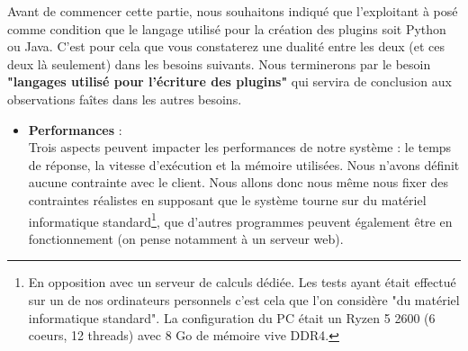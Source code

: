 \documentclass[a4paper,12pt]{article}
\begin{document}
Avant de commencer cette partie, nous souhaitons indiqué que l'exploitant à posé comme condition que le langage utilisé pour la création des plugins soit Python ou Java. C'est pour cela que vous constaterez une dualité entre les deux (et ces deux là seulement) dans les besoins suivants. Nous terminerons par le besoin \textbf{"langages utilisé pour l'écriture des plugins"} qui servira de conclusion aux observations faîtes dans les autres besoins.\\

\begin{itemize}
  
  \item \textbf{Performances} :\\
  Trois aspects peuvent impacter les performances de notre système : le temps de réponse, la vitesse d'exécution et la mémoire utilisées. Nous n'avons définit aucune contrainte avec le client. Nous allons donc nous même nous fixer des contraintes réalistes en supposant que le système tourne sur du matériel informatique standard\footnote{En opposition avec un serveur de calculs dédiée. Les tests ayant était effectué sur un de nos ordinateurs personnels c'est cela que l'on considère "du matériel informatique standard". La configuration du PC était un Ryzen 5 2600 (6 coeurs, 12 threads) avec 8 Go de mémoire vive DDR4.}, que d'autres programmes peuvent également être en fonctionnement (on pense notamment à un serveur web).\\
  

  

\end{itemize}
\end{document}
